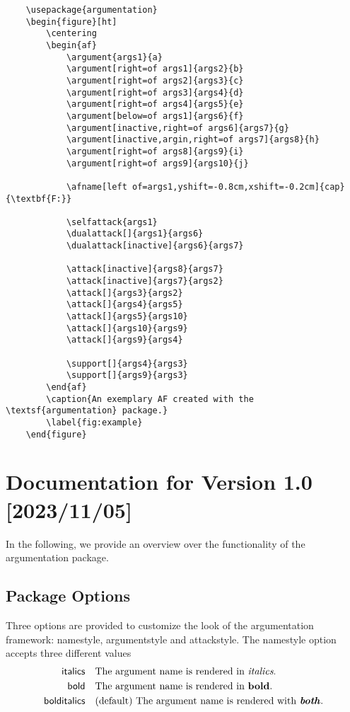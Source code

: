 \documentclass{article}
\begin{document}
\begin{verbatim}
    \usepackage{argumentation}
    \begin{figure}[ht]
        \centering
        \begin{af}
            \argument{args1}{a}
            \argument[right=of args1]{args2}{b}
            \argument[right=of args2]{args3}{c}
            \argument[right=of args3]{args4}{d}
            \argument[right=of args4]{args5}{e}
            \argument[below=of args1]{args6}{f}
            \argument[inactive,right=of args6]{args7}{g}
            \argument[inactive,argin,right=of args7]{args8}{h}
            \argument[right=of args8]{args9}{i}
            \argument[right=of args9]{args10}{j}
    
            \afname[left of=args1,yshift=-0.8cm,xshift=-0.2cm]{cap}{\textbf{F:}}
    
            \selfattack{args1}
            \dualattack[]{args1}{args6}
            \dualattack[inactive]{args6}{args7}
            
            \attack[inactive]{args8}{args7}
            \attack[inactive]{args7}{args2}
            \attack[]{args3}{args2}    
            \attack[]{args4}{args5}
            \attack[]{args5}{args10}
            \attack[]{args10}{args9}
            \attack[]{args9}{args4}

            \support[]{args4}{args3}
            \support[]{args9}{args3}
        \end{af}
        \caption{An exemplary AF created with the \textsf{argumentation} package.}
        \label{fig:example}
    \end{figure}
\end{verbatim}

\section{Documentation for Version 1.0 [2023/11/05]}
In the following, we provide an overview over the functionality of the \textsf{argumentation} package.

\subsection{Package Options}
    Three options are provided to customize the look of the argumentation framework: \textsf{namestyle}, \textsf{argumentstyle} and \textsf{attackstyle}.
    The \textsf{namestyle} option accepts three different values
    \begin{align*}
        \mathsf{italics} &\quad \text{The argument name is rendered in \emph{italics}.}\\
        \mathsf{bold} &\quad \text{The argument name is rendered in \textbf{bold}.}\\
        \mathsf{bolditalics} &\quad \text{(default) The argument name is rendered with \textbf{\emph{both}}.}\\
    \end{align*}
\end{document}
